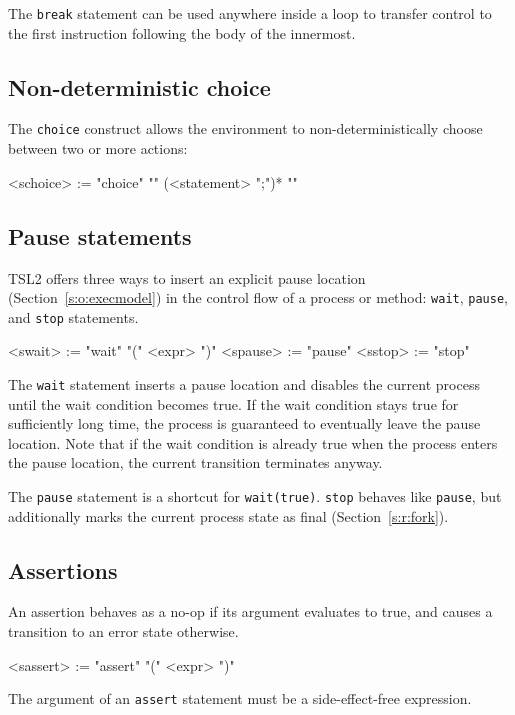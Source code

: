 \documentclass{report}
\newcommand{\src}[1]{\texttt{#1}}
\newcommand{\tsl}{TSL2 }
\begin{document}
The \src{break} statement can be used anywhere inside a loop to 
transfer control to the first instruction following the body of 
the innermost.

\subsection{Non-deterministic choice}  The \src{choice} construct 
allows the environment to non-deterministically choose between
two or more actions:
\begin{bnflisting}{}
<schoice> := "choice" "{"
               (<statement> ";")*
             "}"
\end{bnflisting}

\subsection{Pause statements}

\tsl offers three ways to insert an explicit pause location 
(Section~\ref{s:o:execmodel}) in the control flow of a process or 
method: \src{wait}, \src{pause}, and \src{stop}
statements.
\begin{bnflisting}{}
<swait>  := "wait" "(" <expr> ")"
<spause> := "pause"
<sstop>  := "stop"
\end{bnflisting}

The \src{wait} statement inserts a pause location and disables the 
current process until the wait condition becomes true.  If the 
wait condition stays true for sufficiently long time, the process 
is guaranteed to eventually leave the pause location.  Note that 
if the wait condition is already true when the process enters the 
pause location, the current transition terminates anyway.

The \src{pause} statement is a shortcut for \src{wait(true)}.  
\src{stop} behaves like \src{pause}, but additionally marks the 
current process state as final (Section~\ref{s:r:fork}).

\subsection{Assertions} 

An assertion behaves as a no-op if its argument evaluates to true, 
and causes a transition to an error
state otherwise.
\begin{bnflisting}{}
<sassert> := "assert" "(" <expr> ")"
\end{bnflisting}
The argument of an \src{assert} statement must be a 
side-effect-free expression.
\end{document}

